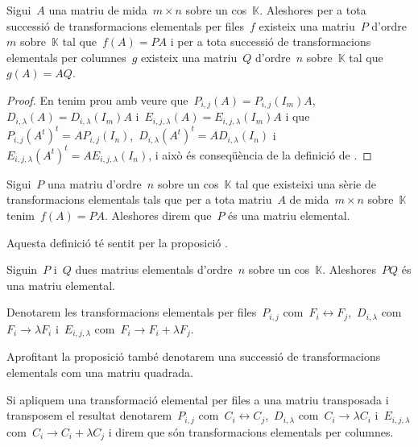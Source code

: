 \documentclass[../../Main.tex]{subfiles}
\begin{document}
	\begin{proposition}
		\label{prop:transformacions elementals i matrius elementals}
		Sigui~\(A\) una matriu de mida~\(m\times n\) sobre un cos~\(\mathbb{K}\).
		Aleshores per a tota successió de transformacions elementals per files~\(f\) existeix una matriu~\(P\) d'ordre~\(m\) sobre~\(\mathbb{K}\) tal que~\(f(A)=PA\) i per a tota successió de transformacions elementals per columnes~\(g\) existeix una matriu~\(Q\) d'ordre~\(n\) sobre~\(\mathbb{K}\) tal que~\(g(A)=AQ\).
%
		\begin{proof}
			En tenim prou amb veure que~\(P_{i,j}(A)=P_{i,j}(I_{m})A\),~\(D_{i,\lambda}(A)=D_{i,\lambda}(I_{m})A\) i~\(E_{i,j,\lambda}(A)=E_{i,j,\lambda}(I_{m})A\) i que~\(P_{i,j}(A^{t})^{t}=AP_{i,j}(I_{n})\),~\(D_{i,\lambda}(A^{t})^{t}=AD_{i,\lambda}(I_{n})\) i~\(E_{i,j,\lambda}(A^{t})^{t}=AE_{i,j,\lambda}(I_{n})\), i això és conseqüència de la definició de .
		\end{proof}
	\end{proposition}
	\begin{definition}
		\label{def:matriu elemental}
		Sigui~\(P\) una matriu d'ordre~\(n\) sobre un cos~\(\mathbb{K}\) tal que existeixi una sèrie de transformacions elementals tals que per a tota matriu~\(A\) de mida~\(m\times n\) sobre~\(\mathbb{K}\) tenim~\(f(A)=PA\).
		Aleshores direm que~\(P\) és una matriu elemental.

		Aquesta definició té sentit per la proposició .
	\end{definition}
	\begin{observation}
		\label{obs:producte de matrius elementals és matriu elemental}
		Siguin~\(P\) i~\(Q\) dues matrius elementals d'ordre~\(n\) sobre un cos~\(\mathbb{K}\).
		Aleshores~\(PQ\) és una matriu elemental.
	\end{observation}
	\begin{notation}
		Denotarem les transformacions elementals per files~\(P_{i,j}\) com~\(F_{i}\leftrightarrow F_{j}\),~\(D_{i,\lambda}\) com~\(F_{i}\rightarrow\lambda F_{i}\) i~\(E_{i,j,\lambda}\) com~\(F_{i}\rightarrow F_{i}+\lambda F_{j}\).

		Aprofitant la proposició  també denotarem una successió de transformacions elementals com una matriu quadrada.

		Si apliquem una transformació elemental per files a una matriu transposada i transposem el resultat denotarem~\(P_{i,j}\) com~\(C_{i}\leftrightarrow C_{j}\),~\(D_{i,\lambda}\) com~\(C_{i}\rightarrow\lambda C_{i}\) i~\(E_{i,j,\lambda}\) com~\(C_{i}\rightarrow C_{i}+\lambda C_{j}\) i direm que són transformacions elementals per columnes.
	\end{notation}
\end{document}
